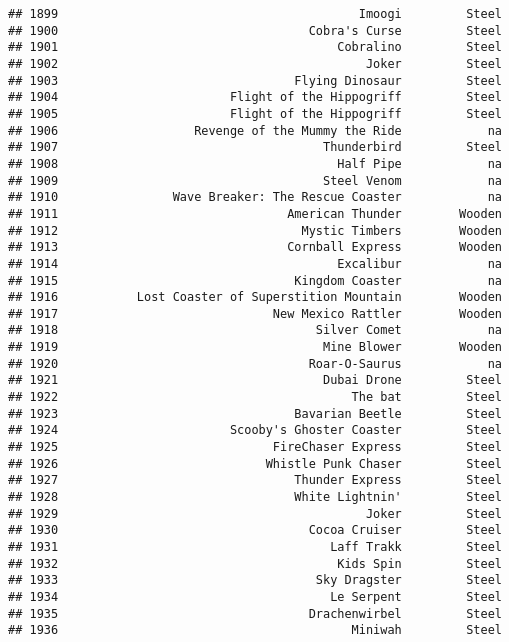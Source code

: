 \documentclass[
]{article}
\begin{document}
\begin{verbatim}
## 1899                                          Imoogi         Steel
## 1900                                   Cobra's Curse         Steel
## 1901                                       Cobralino         Steel
## 1902                                           Joker         Steel
## 1903                                 Flying Dinosaur         Steel
## 1904                        Flight of the Hippogriff         Steel
## 1905                        Flight of the Hippogriff         Steel
## 1906                   Revenge of the Mummy the Ride            na
## 1907                                     Thunderbird         Steel
## 1908                                       Half Pipe            na
## 1909                                     Steel Venom            na
## 1910                Wave Breaker: The Rescue Coaster            na
## 1911                                American Thunder        Wooden
## 1912                                  Mystic Timbers        Wooden
## 1913                                Cornball Express        Wooden
## 1914                                       Excalibur            na
## 1915                                 Kingdom Coaster            na
## 1916           Lost Coaster of Superstition Mountain        Wooden
## 1917                              New Mexico Rattler        Wooden
## 1918                                    Silver Comet            na
## 1919                                     Mine Blower        Wooden
## 1920                                   Roar-O-Saurus            na
## 1921                                     Dubai Drone         Steel
## 1922                                         The bat         Steel
## 1923                                 Bavarian Beetle         Steel
## 1924                        Scooby's Ghoster Coaster         Steel
## 1925                              FireChaser Express         Steel
## 1926                             Whistle Punk Chaser         Steel
## 1927                                 Thunder Express         Steel
## 1928                                 White Lightnin'         Steel
## 1929                                           Joker         Steel
## 1930                                   Cocoa Cruiser         Steel
## 1931                                      Laff Trakk         Steel
## 1932                                       Kids Spin         Steel
## 1933                                    Sky Dragster         Steel
## 1934                                      Le Serpent         Steel
## 1935                                   Drachenwirbel         Steel
## 1936                                         Miniwah         Steel

\end{verbatim}
\end{document}
